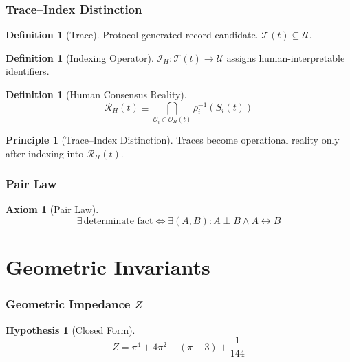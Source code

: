 \documentclass[12pt,a4paper]{article}
\numberwithin{equation}{section}
\theoremstyle{plain}
\theoremstyle{definition}
\newtheorem{definition}[theorem]{Definition}
\newtheorem{axiom}{Axiom}[section]
\newtheorem{principle}{Principle}[section]
\newtheorem{hypothesis}[theorem]{Hypothesis}
\theoremstyle{remark}
\newcommand{\Universe}{\ensuremath{\mathcal{U}}}
\newcommand{\Reality}{\ensuremath{\mathcal{R}}}
\newcommand{\Observer}{\ensuremath{\mathcal{O}}}
\newcommand{\Memory}{\ensuremath{\mathcal{I}}}
\newcommand{\Zed}{\ensuremath{Z}}
\begin{document}
\section{Trace--Index Distinction}
\label{sec:trace-index}

\begin{definition}[Trace]
Protocol-generated record candidate. $\mathcal{T}(t) \subseteq \Universe$.
\end{definition}

\begin{definition}[Indexing Operator]
$\Memory_H : \mathcal{T}(t) \to \Universe$ assigns human-interpretable identifiers.
\end{definition}

\begin{definition}[Human Consensus Reality]
\[
\Reality_H(t) \equiv \bigcap_{\Observer_i \in \Observer_H(t)} \rho_i^{-1}(S_i(t))
\]
\end{definition}

\begin{principle}[Trace--Index Distinction]
Traces become operational reality only after indexing into $\Reality_H(t)$.
\end{principle}

\section{Pair Law}
\label{sec:pairlaw}

\begin{axiom}[Pair Law]
\label{ax:pair}
\[
\boxed{\exists\,\text{determinate fact} \iff \exists(A,B): A \perp B \land A \leftrightarrow B}
\]
\end{axiom}

\part{Geometric Invariants}
\label{part:geometry}

\section{Geometric Impedance $\Zed$}
\label{sec:Z}

\begin{hypothesis}[Closed Form]
\label{hyp:Z}
\[
\boxed{\Zed = \pi^4 + 4\pi^2 + (\pi - 3) + \frac{1}{144}}
\]
\end{hypothesis}
\end{document}
